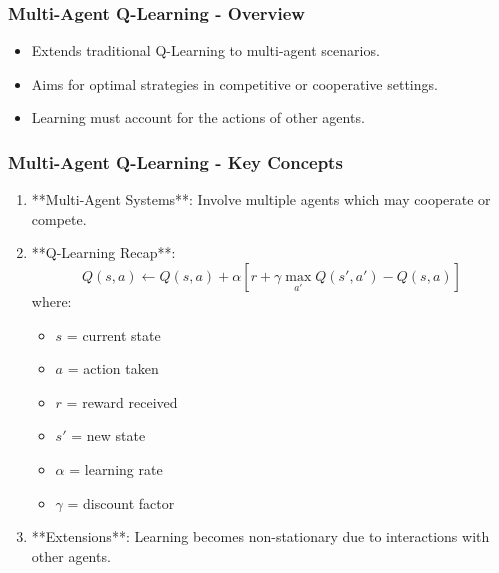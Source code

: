 \documentclass[aspectratio=169]{beamer}
\begin{document}
\begin{frame}[fragile]
    \frametitle{Multi-Agent Q-Learning - Overview}
    \begin{itemize}
        \item Extends traditional Q-Learning to multi-agent scenarios.
        \item Aims for optimal strategies in competitive or cooperative settings.
        \item Learning must account for the actions of other agents.
    \end{itemize}
\end{frame}

\begin{frame}[fragile]
    \frametitle{Multi-Agent Q-Learning - Key Concepts}
    \begin{enumerate}
        \item **Multi-Agent Systems**: Involve multiple agents which may cooperate or compete.
        \item **Q-Learning Recap**:
            \begin{equation}
            Q(s, a) \leftarrow Q(s, a) + \alpha \left[ r + \gamma \max_{a'} Q(s', a') - Q(s, a) \right]
            \end{equation}
            where:
            \begin{itemize}
                \item \(s\) = current state
                \item \(a\) = action taken
                \item \(r\) = reward received
                \item \(s'\) = new state
                \item \(\alpha\) = learning rate
                \item \(\gamma\) = discount factor
            \end{itemize}
        \item **Extensions**: Learning becomes non-stationary due to interactions with other agents.
    \end{enumerate}
\end{frame}
\end{document}
